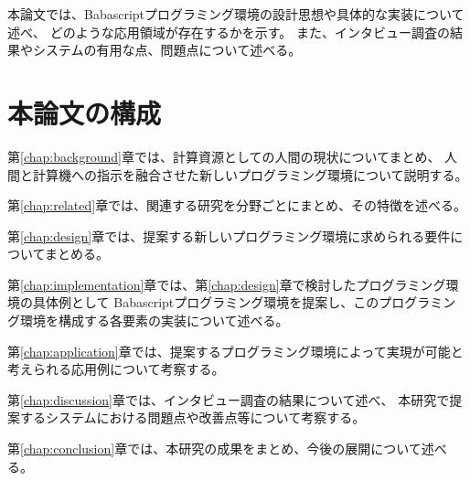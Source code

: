 本論文では、Babascriptプログラミング環境の設計思想や具体的な実装について述べ、
どのような応用領域が存在するかを示す。
また、インタビュー調査の結果やシステムの有用な点、問題点について述べる。

\section{本論文の構成}\label{ux672cux8ad6ux6587ux306eux69cbux6210}

第\ref{chap:background}章では、計算資源としての人間の現状についてまとめ、
人間と計算機への指示を融合させた新しいプログラミング環境について説明する。

第\ref{chap:related}章では、関連する研究を分野ごとにまとめ、その特徴を述べる。

第\ref{chap:design}章では、提案する新しいプログラミング環境に求められる要件についてまとめる。

第\ref{chap:implementation}章では、第\ref{chap:design}章で検討したプログラミング環境の具体例として
Babascriptプログラミング環境を提案し、このプログラミング環境を構成する各要素の実装について述べる。

第\ref{chap:application}章では、提案するプログラミング環境によって実現が可能と考えられる応用例について考察する。

第\ref{chap:discussion}章では、インタビュー調査の結果について述べ、
本研究で提案するシステムにおける問題点や改善点等について考察する。

第\ref{chap:conclusion}章では、本研究の成果をまとめ、今後の展開について述べる。
